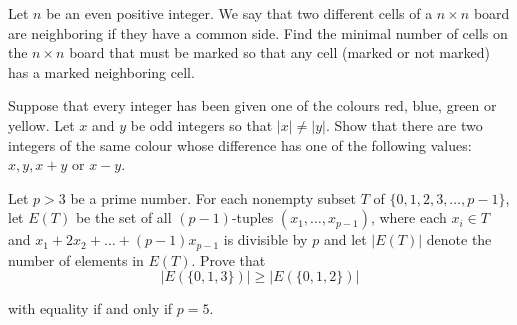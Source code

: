 \item[\textbf{C5.}]Let $n$ be an even positive integer. We say that two different cells of a $n \times n$ board are neighboring if they have a common side. Find the minimal number of cells on the $n \times n$ board that must be marked so that any cell (marked or not marked) has a marked neighboring cell.

\item[\textbf{C6.}]Suppose that every integer has been given one of the colours red, blue, green or yellow. Let $x$ and $y$ be odd integers so that $|x| \neq |y|$. Show that there are two integers of the same colour whose difference has one of the following values: $x,y,x+y$ or $x-y$.

\item[\textbf{C7.}]Let $p >3$ be a prime number. For each nonempty subset $T$ of $\{0,1,2,3, \ldots , p-1\}$,  let $E(T)$ be the set of all $(p-1)$-tuples $(x_1, \ldots ,x_{p-1} )$,  where each $x_i \in T$ and $x_1+2x_2+ \ldots + (p-1)x_{p-1}$ is divisible by $p$ and let $|E(T)|$ denote the number of elements in $E(T)$. Prove that\[|E(\{0,1,3\})| \geq |E(\{0,1,2\})|\]

with equality if and only if $p = 5$.